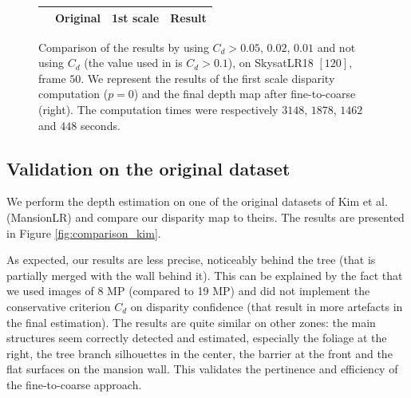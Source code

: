 \documentclass{article}
\theoremstyle{definition}
\begin{document}
\begin{figure}[ht]
\begin{tabular}{|c||c|c|c|}
  \hline
  & Original & 1st scale & Result \\ \hline
 \end{tabular}
 \caption{Comparison of the results by using $C_d > 0.05,\, 0.02, \, 0.01$ and not using $C_d$ (the value used in \cite{art:kim13:lfields} is $C_d > 0.1$), on SkysatLR18 $[120]$, frame $50$. We represent the results of the first scale disparity computation ($p=0$) and the final depth map after fine-to-coarse (right). The computation times were respectively $3148$, $1878$, $1462$ and $448$ seconds.} %
 \label{fig:c_d_comparison}
\end{figure}


\subsection{Validation on the original dataset} 


We perform the depth estimation on one of the original datasets of Kim et al. (MansionLR) and compare our disparity map to theirs. The results are presented in Figure \ref{fig:comparison_kim}. 

As expected, our results are less precise, noticeably behind the tree (that is partially merged with the wall behind it). This can be explained by the fact that we used images of 8 MP (compared to 19 MP) and did not implement the conservative criterion $C_d$ on disparity confidence (that result in more artefacts in the final estimation). The results are quite similar on other zones: the main structures seem correctly detected and estimated, especially the foliage at the right, the tree branch silhouettes in the center, the barrier at the front and the flat surfaces on the mansion wall. This validates the pertinence and efficiency of the fine-to-coarse approach.
\end{document}
